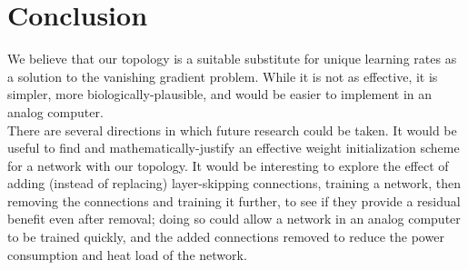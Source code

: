 \documentclass[format=sigconf]{acmart}
\newcommand{\npar}{\\\indent}
\begin{document}
\section{Conclusion}

We believe that our topology is a suitable substitute for unique learning rates as a solution to the vanishing gradient problem. While it is not as effective, it is simpler, more biologically-plausible, and would be easier to implement in an analog computer.
\npar
There are several directions in which future research could be taken. It would be useful to find and mathematically-justify an effective weight initialization scheme for a network with our topology. It would be interesting to explore the effect of adding (instead of replacing) layer-skipping connections, training a network, then removing the connections and training it further, to see if they provide a residual benefit even after removal; doing so could allow a network in an analog computer to be trained quickly, and the added connections removed to reduce the power consumption and heat load of the network. 




\end{document}
